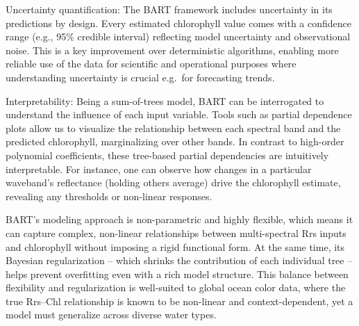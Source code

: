 \documentclass[
]{agujournal2019}
\begin{document}
Uncertainty quantification: The BART framework includes uncertainty in
its predictions by design. Every estimated chlorophyll value comes with
a confidence range (e.g., 95\% credible interval) reflecting model
uncertainty and observational noise. This is a key improvement over
deterministic algorithms, enabling more reliable use of the data for
scientific and operational purposes where understanding uncertainty is
crucial e.g.~for forecasting trends.

Interpretability: Being a sum-of-trees model, BART can be interrogated
to understand the influence of each input variable. Tools such as
partial dependence plots allow us to visualize the relationship between
each spectral band and the predicted chlorophyll, marginalizing over
other bands. In contrast to high-order polynomial coefficients, these
tree-based partial dependencies are intuitively interpretable. For
instance, one can observe how changes in a particular waveband's
reflectance (holding others average) drive the chlorophyll estimate,
revealing any thresholds or non-linear responses.

BART's modeling approach is non-parametric and highly flexible, which
means it can capture complex, non-linear relationships between
multi-spectral Rrs inputs and chlorophyll without imposing a rigid
functional form. At the same time, its Bayesian regularization -- which
shrinks the contribution of each individual tree -- helps prevent
overfitting even with a rich model structure. This balance between
flexibility and regularization is well-suited to global ocean color
data, where the true Rrs--Chl relationship is known to be non-linear and
context-dependent, yet a model must generalize across diverse water
types.
\end{document}

